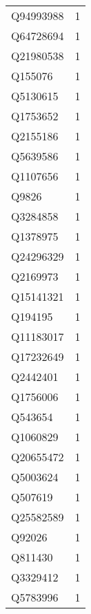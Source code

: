 \begin{tabular}{lr}
   Q94993988 &                             1 \\
   Q64728694 &                             1 \\
   Q21980538 &                             1 \\
     Q155076 &                             1 \\
    Q5130615 &                             1 \\
    Q1753652 &                             1 \\
    Q2155186 &                             1 \\
    Q5639586 &                             1 \\
    Q1107656 &                             1 \\
       Q9826 &                             1 \\
    Q3284858 &                             1 \\
    Q1378975 &                             1 \\
   Q24296329 &                             1 \\
    Q2169973 &                             1 \\
   Q15141321 &                             1 \\
     Q194195 &                             1 \\
   Q11183017 &                             1 \\
   Q17232649 &                             1 \\
    Q2442401 &                             1 \\
    Q1756006 &                             1 \\
     Q543654 &                             1 \\
    Q1060829 &                             1 \\
   Q20655472 &                             1 \\
    Q5003624 &                             1 \\
     Q507619 &                             1 \\
   Q25582589 &                             1 \\
      Q92026 &                             1 \\
     Q811430 &                             1 \\
    Q3329412 &                             1 \\
    Q5783996 &                             1 \\

\end{tabular}
